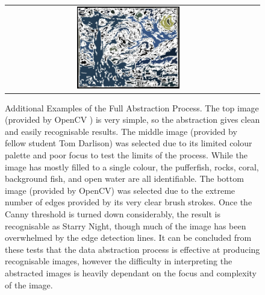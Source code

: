 \begin{figure}[ht]
\begin{center}
\begin{tabular}{ c c }
        \includegraphics[width=0.43\textwidth]{Figures/starry_nightDA.jpg} 
    \end{tabular}
    \caption[Additional Examples of the Full Abstraction Process]{Additional Examples of the Full Abstraction Process. The top image (provided by OpenCV \cite{OpenCV}) is very simple, so the abstraction gives clean and easily recognisable results. The middle image (provided by fellow student Tom Darlison) was selected due to its limited colour palette and poor focus to test the limits of the process. While the image has mostly filled to a single colour, the pufferfish, rocks, coral, background fish, and open water are all identifiable. The bottom image (provided by OpenCV) was selected due to the extreme number of edges provided by its very clear brush strokes. Once the Canny threshold is turned down considerably, the result is recognisable as Starry Night, though much of the image has been overwhelmed by the edge detection lines. It can be concluded from these tests that the data abstraction process is effective at producing recognisable images, however the difficulty in interpreting the abstracted images is heavily dependant on the focus and complexity of the image.}
    \label{fig:FinalExtras}
    \end{center}
\end{figure}